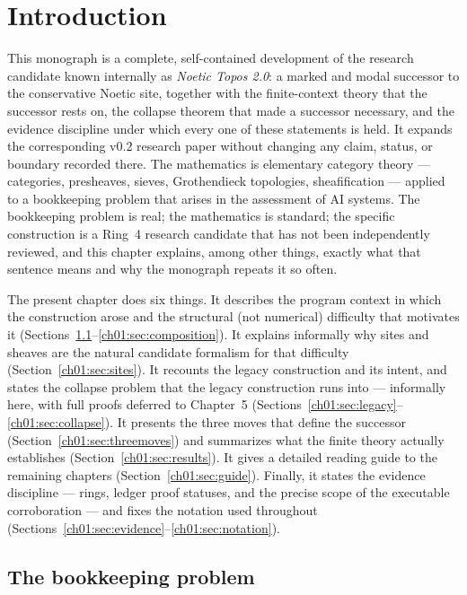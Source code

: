 \chapter{Introduction}\label{ch01:chap}

This monograph is a complete, self-contained development of the research
candidate known internally as \emph{Noetic Topos 2.0}: a marked and modal
successor to the conservative Noetic site, together with the finite-context
theory that the successor rests on, the collapse theorem that made a successor
necessary, and the evidence discipline under which every one of these
statements is held. It expands the corresponding v0.2 research paper without
changing any claim, status, or boundary recorded there. The mathematics is
elementary category theory --- categories, presheaves, sieves, Grothendieck
topologies, sheafification --- applied to a bookkeeping problem that arises in
the assessment of AI systems. The bookkeeping problem is real; the mathematics
is standard; the specific construction is a Ring~4 research candidate that has
not been independently reviewed, and this chapter explains, among other
things, exactly what that sentence means and why the monograph repeats it so
often.

The present chapter does six things. It describes the program context in
which the construction arose and the structural (not numerical) difficulty
that motivates it (Sections~\ref{ch01:sec:problem}--\ref{ch01:sec:composition}).
It explains informally why sites and sheaves are the natural candidate
formalism for that difficulty (Section~\ref{ch01:sec:sites}). It recounts the
legacy construction and its intent, and states the collapse problem that the
legacy construction runs into --- informally here, with full proofs deferred
to Chapter~5 (Sections~\ref{ch01:sec:legacy}--\ref{ch01:sec:collapse}). It
presents the three moves that define the successor
(Section~\ref{ch01:sec:threemoves}) and summarizes what the finite theory
actually establishes (Section~\ref{ch01:sec:results}). It gives a detailed
reading guide to the remaining chapters (Section~\ref{ch01:sec:guide}).
Finally, it states the evidence discipline --- rings, ledger proof statuses,
and the precise scope of the executable corroboration --- and fixes the
notation used throughout (Sections~\ref{ch01:sec:evidence}--\ref{ch01:sec:notation}).

\section{The bookkeeping problem}\label{ch01:sec:problem}

